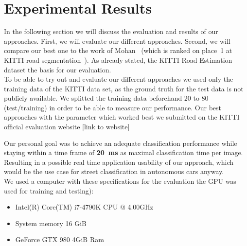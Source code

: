 
\section{Experimental Results}\label{sec:evaluation}

In the following section we will discuss the evaluation and results of our approaches. First, we will evaluate our different approaches. Second, we will compare our best one to the work of Mohan~\cite{Tarel2009} (which is ranked on place~1 at KITTI road segmentation~\cite{Tarel2009}).
As already stated, the KITTI Road Estimation dataset the basis for our evaluation.\\
To be able to try out and evaluate our different approaches we used only the training data of the KITTI data set, as the ground truth for the test data is not publicly available. We splitted the training data beforehand 20 to 80 (test/training) in order to be able to measure our performance.
Our best approaches with the parameter which worked best we submitted on the KITTI official evaluation website [link to website]


Our personal goal was to achieve an adequate classification performance while staying within a time frame of \textbf{\SI{20}{\milli\second}} as maximal classification time per image. Resulting in a possible real time application usability of our approach, which would be the use case for street classification in autonomous cars anyway.\\

We used a computer with these specifications for the evaluation the GPU was used for training and testing):
\begin{itemize}
\item Intel(R) Core(TM) i7-4790K CPU @ 4.00GHz
\item System memory 16 GiB
\item GeForce GTX 980 4GiB Ram
\end{itemize}

